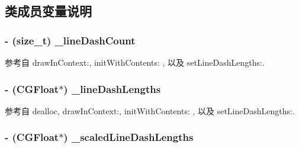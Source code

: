 \subsection{类成员变量说明}
\hypertarget{interface_r_m_path_ad3e04fb162632bb0b1a16e73e566ca21}{
\subsubsection[{\-\_\-line\-Dash\-Count}]{\setlength{\rightskip}{0pt plus 5cm}-\/ (size\-\_\-t) \-\_\-line\-Dash\-Count\hspace{0.3cm}{\ttfamily [protected]}}}\label{interface_r_m_path_ad3e04fb162632bb0b1a16e73e566ca21}


参考自 draw\-In\-Context\-:, init\-With\-Contents\-: , 以及 set\-Line\-Dash\-Lengths\-:.

\hypertarget{interface_r_m_path_acf58af65bc4c356e2ef1944810801d13}{
\subsubsection[{\-\_\-line\-Dash\-Lengths}]{\setlength{\rightskip}{0pt plus 5cm}-\/ (C\-G\-Float$\ast$) \-\_\-line\-Dash\-Lengths\hspace{0.3cm}{\ttfamily [protected]}}}\label{interface_r_m_path_acf58af65bc4c356e2ef1944810801d13}


参考自 dealloc, draw\-In\-Context\-:, init\-With\-Contents\-: , 以及 set\-Line\-Dash\-Lengths\-:.

\hypertarget{interface_r_m_path_aa91685824ea8a4e4d69c76bb64712fc0}{
\subsubsection[{\-\_\-scaled\-Line\-Dash\-Lengths}]{\setlength{\rightskip}{0pt plus 5cm}-\/ (C\-G\-Float$\ast$) \-\_\-scaled\-Line\-Dash\-Lengths\hspace{0.3cm}{\ttfamily [protected]}}}\label{interface_r_m_path_aa91685824ea8a4e4d69c76bb64712fc0}


